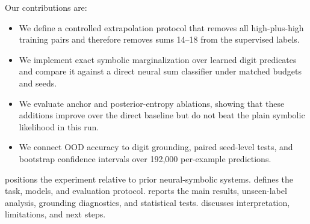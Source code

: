 Our contributions are:
\begin{itemize}[leftmargin=*,itemsep=0pt,topsep=0pt]
    \item We define a controlled \addmnist extrapolation protocol that removes all high-plus-high training pairs and therefore removes sums 14--18 from the supervised labels.
    \item We implement exact symbolic marginalization over learned digit predicates and compare it against a direct neural sum classifier under matched budgets and seeds.
    \item We evaluate anchor and posterior-entropy ablations, showing that these additions improve over the direct baseline but do not beat the plain symbolic likelihood in this run.
    \item We connect OOD accuracy to digit grounding, paired seed-level tests, and bootstrap confidence intervals over 192,000 per-example predictions.
\end{itemize}

  positions the experiment relative to prior neural-symbolic systems.  defines the task, models, and evaluation protocol.  reports the main results, unseen-label analysis, grounding diagnostics, and statistical tests.  discusses interpretation, limitations, and next steps.
